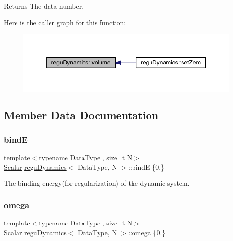 \begin{DoxyReturn}{Returns}
The data number. 
\end{DoxyReturn}
Here is the caller graph for this function\+:\nopagebreak
\begin{figure}[H]
\begin{center}
\leavevmode
\includegraphics[width=350pt]{classregu_dynamics_a3a00b2009ce88898871ca024c30c6882_icgraph}
\end{center}
\end{figure}


\subsection{Member Data Documentation}
\mbox{\label{classregu_dynamics_a7e2b804745638810d38ed547487c26f2}} 
\subsubsection{\texorpdfstring{bindE}{bindE}}
{\footnotesize\ttfamily template$<$typename Data\+Type , size\+\_\+t N$>$ \\
\mbox{\hyperlink{classregu_dynamics_a359c55370b4dee032396f0df86ad5fab}{Scalar}} \mbox{\hyperlink{classregu_dynamics}{regu\+Dynamics}}$<$ Data\+Type, N $>$\+::bindE \{0.\}}



The binding energy(for regularization) of the dynamic system. 

\mbox{\label{classregu_dynamics_afef2a874c21e951765e50a497a411eae}} 
\subsubsection{\texorpdfstring{omega}{omega}}
{\footnotesize\ttfamily template$<$typename Data\+Type , size\+\_\+t N$>$ \\
\mbox{\hyperlink{classregu_dynamics_a359c55370b4dee032396f0df86ad5fab}{Scalar}} \mbox{\hyperlink{classregu_dynamics}{regu\+Dynamics}}$<$ Data\+Type, N $>$\+::omega \{0.\}}



